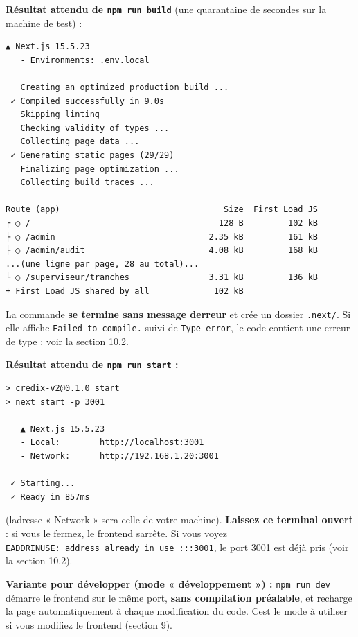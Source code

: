\documentclass[
  french,
  11pt,
  a4paper,
]{article}
\begin{document}
\textbf{Résultat attendu de \texttt{npm\ run\ build}} (une quarantaine
de secondes sur la machine de test) :

\begin{Verbatim}[breaklines=true,breakanywhere=true,fontsize=\small,frame=leftline,framerule=1.6pt,rulecolor=\color{credixblue},framesep=3mm,xleftmargin=2mm,xrightmargin=1mm]
   ▲ Next.js 15.5.23
   - Environments: .env.local

   Creating an optimized production build ...
 ✓ Compiled successfully in 9.0s
   Skipping linting
   Checking validity of types ...
   Collecting page data ...
 ✓ Generating static pages (29/29)
   Finalizing page optimization ...
   Collecting build traces ...

Route (app)                                 Size  First Load JS
┌ ○ /                                      128 B         102 kB
├ ○ /admin                               2.35 kB         161 kB
├ ○ /admin/audit                         4.08 kB         168 kB
...(une ligne par page, 28 au total)...
└ ○ /superviseur/tranches                3.31 kB         136 kB
+ First Load JS shared by all             102 kB
\end{Verbatim}

La commande \textbf{se termine sans message d\textquotesingle erreur} et
crée un dossier \texttt{.next/}. Si elle affiche
\texttt{Failed\ to\ compile.\allowbreak{}} suivi de
\texttt{Type\ error}, le code contient une erreur de type : voir la
section 10.2.

\textbf{Résultat attendu de \texttt{npm\ run\ start} :}

\begin{Verbatim}[breaklines=true,breakanywhere=true,fontsize=\small,frame=leftline,framerule=1.6pt,rulecolor=\color{credixblue},framesep=3mm,xleftmargin=2mm,xrightmargin=1mm]
> credix-v2@0.1.0 start
> next start -p 3001

   ▲ Next.js 15.5.23
   - Local:        http://localhost:3001
   - Network:      http://192.168.1.20:3001

 ✓ Starting...
 ✓ Ready in 857ms
\end{Verbatim}

(l\textquotesingle adresse « Network » sera celle de votre machine).
\textbf{Laissez ce terminal ouvert} : si vous le fermez, le frontend
s\textquotesingle arrête. Si vous voyez
\texttt{EADDRINUSE:\ address\ already\ in\ use\ :::3001}, le port 3001
est déjà pris (voir la section 10.2).

\textbf{Variante pour développer (mode « développement ») :}
\texttt{npm\ run\ dev} démarre le frontend sur le même port,
\textbf{sans compilation préalable}, et recharge la page automatiquement
à chaque modification du code. C\textquotesingle est le mode à utiliser
si vous modifiez le frontend (section 9).
\end{document}
